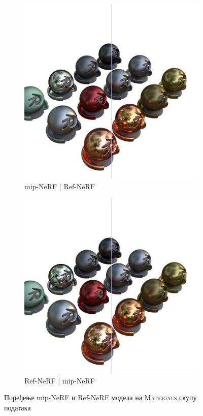 \documentclass[12pt, a4paper, twoside]{book}
\numberwithin{equation}{chapter}
\numberwithin{theorem}{section}
\numberwithin{definition}{section}
\numberwithin{definitionChapter}{chapter}
\begin{document}
	\begin{figure}[H]
		\centering
		\begin{subfigure}{0.475\textwidth}
			\centering
			\includegraphics[scale=0.25]{img/comparison/mipnerf_vs_refnerf_materials_36.png}
			\caption{mip-NeRF | Ref-NeRF}
		\end{subfigure}
		\begin{subfigure}{0.475\textwidth}
			\centering
			\includegraphics[scale=0.25]{img/comparison/refnerf_vs_mipnerf_materials_36.png}
			\caption{Ref-NeRF | mip-NeRF}
		\end{subfigure}
		\caption{Поређење mip-NeRF и Ref-NeRF модела на \textsc{Materials} скупу података}
		\label{fig-materials-comparison}
	\end{figure}
\end{document}
